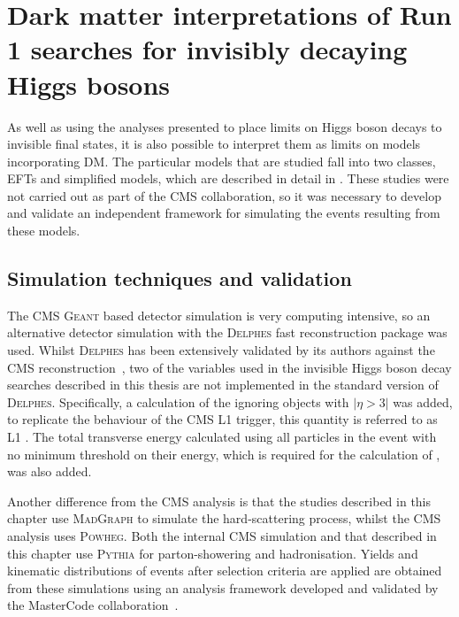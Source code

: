 \chapter{Dark matter interpretations of Run 1 searches for invisibly decaying Higgs bosons}
\label{chap:interp}
As well as using the analyses presented to place limits on Higgs boson decays to invisible final states, it is also possible to interpret them as limits on models incorporating \ac{DM}. The particular models that are studied fall into two classes, \ac{EFT}s and simplified models, which are described in detail in . These studies were not carried out as part of the CMS collaboration, so it was necessary to develop and validate an independent framework for simulating the events resulting from these models.


\section{Simulation techniques and validation}
\label{sec:dmval}
The CMS \textsc{Geant} based detector simulation is very computing intensive, so an alternative detector simulation with the \textsc{Delphes} fast reconstruction package was used. Whilst \textsc{Delphes} has been extensively validated by its authors against the CMS reconstruction~\cite{Favereau2014}, two of the variables used in the invisible Higgs boson decay searches described in this thesis are not implemented in the standard version of \textsc{Delphes}. Specifically, a calculation of the \MET ignoring objects with $|\eta>3|$ was added, to replicate the behaviour of the CMS \ac{L1} trigger, this quantity is referred to as \ac{L1} \MET. The total transverse energy calculated using all particles in the event with no minimum threshold on their energy, which is required for the calculation of \METsig, was also added.

Another difference from the CMS analysis is that the studies described in this chapter use \textsc{MadGraph} to simulate the hard-scattering process, whilst the CMS analysis uses \textsc{Powheg}. Both the internal CMS simulation and that described in this chapter use \textsc{Pythia} for parton-showering and hadronisation. Yields and kinematic distributions of events after selection criteria are applied are obtained from these simulations using an analysis framework developed and validated by the MasterCode collaboration~\cite{deVries:2015hva}.

